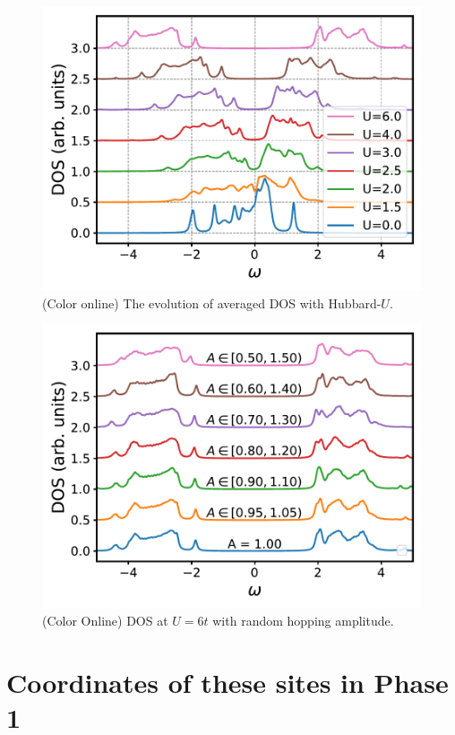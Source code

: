 \documentclass[aps,prb,reprint,amsfonts,amsmath,amssymb,showpacs,groupedaddress,superscriptaddress,onecolumn]{revtex4-1}
\begin{document}
\begin{figure}[p]
    \includegraphics[width=0.8\columnwidth]{CPTForPhase2andPhase3.pdf}
    \caption{\label{fig:CPTForPhase2andPhase3} (Color online) The evolution of averaged DOS with Hubbard-$U$.}
\end{figure}

\begin{figure}
    \includegraphics[width=0.8\columnwidth]{CPTForPhase2andPhase3Random.pdf}
    \caption{\label{fig:CPTForPhase2andPhase3Random} (Color Online) DOS at $U = 6t$ with random hopping amplitude.}
\end{figure}

\appendix

\section{\label{appx:Coordinates}Coordinates of these sites in Phase 1}
\end{document}
